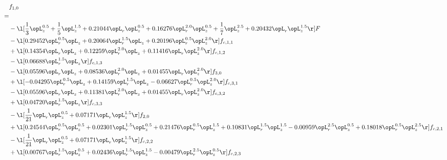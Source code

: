 \begin{alignat}{2} 
\label{eq:f_10_2} 
& f_{1,0} \nonumber \\ 
 = \\ 
& - \l[ \frac{1}{3} \opL_z^{0.5} + \frac{1}{5} \opL_z^{1.5} +  0.21044 \opL_r \opL_z^{0.5} +  0.16276 \opL_r^{2.0} \opL_z^{0.5} + \frac{1}{7} \opL_z^{2.5} +  0.20432 \opL_r \opL_z^{1.5}  \r] F \nonumber \\ 
& - \l[  0.29452 \opL_r^{0.5} \opL_z +  0.20064 \opL_r^{1.5} \opL_z +  0.20196 \opL_r^{0.5} \opL_z^{2.0}  \r] f_{c,1,1} \nonumber \\ 
& + \l[  0.14354 \opL_r \opL_z +  0.12259 \opL_r^{2.0} \opL_z +  0.11416 \opL_r \opL_z^{2.0}  \r] f_{c,1,2} \nonumber \\ 
& - \l[  0.06688 \opL_r^{1.5} \opL_z  \r] f_{c,1,3} \nonumber \\ 
& - \l[  0.05596 \opL_r \opL_z +  0.08536 \opL_r^{2.0} \opL_z +  0.01455 \opL_r \opL_z^{2.0}  \r] f_{3,0} \nonumber \\ 
& + \l[  -0.04295 \opL_r^{0.5} \opL_z +  0.14159 \opL_r^{1.5} \opL_z   -0.06627 \opL_r^{0.5} \opL_z^{2.0}  \r] f_{c,3,1} \nonumber \\ 
& - \l[  0.05596 \opL_r \opL_z +  0.11381 \opL_r^{2.0} \opL_z +  0.01455 \opL_r \opL_z^{2.0}  \r] f_{c,3,2} \nonumber \\ 
& + \l[  0.04720 \opL_r^{1.5} \opL_z  \r] f_{c,3,3} \nonumber \\ 
& - \l[ \frac{1}{21} \opL_r \opL_z^{0.5} +  0.07171 \opL_r \opL_z^{1.5}  \r] f_{2,0} \nonumber \\ 
& + \l[  0.24544 \opL_r^{0.5} \opL_z^{0.5} +  0.02301 \opL_r^{1.5} \opL_z^{0.5} +  0.21476 \opL_r^{0.5} \opL_z^{1.5} +  0.10831 \opL_r^{1.5} \opL_z^{1.5}   -0.00959 \opL_r^{2.5} \opL_z^{0.5} +  0.18018 \opL_r^{0.5} \opL_z^{2.5}  \r] f_{c,2,1} \nonumber \\ 
& - \l[ \frac{1}{21} \opL_r \opL_z^{0.5} +  0.07171 \opL_r \opL_z^{1.5}  \r] f_{c,2,2} \nonumber \\ 
& + \l[  0.00767 \opL_r^{1.5} \opL_z^{0.5} +  0.02436 \opL_r^{1.5} \opL_z^{1.5}   -0.00479 \opL_r^{2.5} \opL_z^{0.5}  \r] f_{c,2,3} \nonumber \\ 
\end{alignat} 


